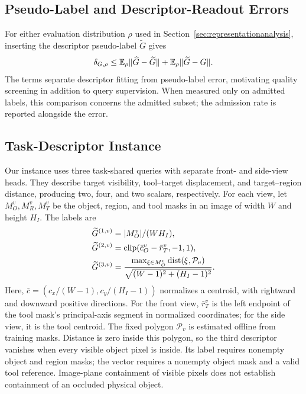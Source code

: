\subsection{Pseudo-Label and Descriptor-Readout Errors}
\label{app:pseudolabel}
For either evaluation distribution $\rho$ used in Section~\ref{sec:representationanalysis}, inserting the descriptor pseudo-label $\widetilde G$ gives
\begin{equation}
 \delta_{G,\rho}
 \le \mathbb E_\rho\lVert\widehat G-\widetilde G\rVert
    +\mathbb E_\rho\lVert\widetilde G-G\rVert.
 \label{eq:pseudolabel}
\end{equation}
The terms separate descriptor fitting from pseudo-label error, motivating quality screening in addition to query supervision.
When measured only on admitted labels, this comparison concerns the admitted subset; the admission rate is reported alongside the error.

\subsection{Task-Descriptor Instance}
\label{app:descriptorinstance}
Our instance uses three task-shared queries with separate front- and side-view heads.
They describe target visibility, tool--target displacement, and target--region distance, producing two, four, and two scalars, respectively.
For each view, let $M_O^v,M_R^v,M_T^v$ be the object, region, and tool masks in an image of width $W$ and height $H_I$.
The labels are
\begin{equation}
 \begin{aligned}
 \widetilde G^{(1,v)}&=|M_O^v|/(WH_I),\\
 \widetilde G^{(2,v)}&=\operatorname{clip}(\bar c_O^v-\bar r_T^v,-1,1),\\
 \widetilde G^{(3,v)}&=\frac{\max_{\xi\in M_O^v}
       \operatorname{dist}(\xi,\mathcal P_v)}
       {\sqrt{(W-1)^2+(H_I-1)^2}}.
 \end{aligned}
 \label{eq:methodgeometry}
\end{equation}
Here, $\bar c=(c_x/(W-1),c_y/(H_I-1))$ normalizes a centroid, with rightward and downward positive directions.
For the front view, $\bar r_T^v$ is the left endpoint of the tool mask's principal-axis segment in normalized coordinates; for the side view, it is the tool centroid.
The fixed polygon $\mathcal P_v$ is estimated offline from training masks.
Distance is zero inside this polygon, so the third descriptor vanishes when every visible object pixel is inside.
Its label requires nonempty object and region masks; the vector requires a nonempty object mask and a valid tool reference.
Image-plane containment of visible pixels does not establish containment of an occluded physical object.

